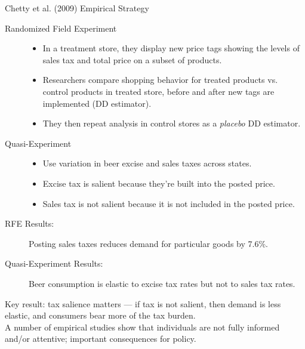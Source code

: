 \documentclass[8pt]{extarticle}
\begin{document}
  \begin{problem}{Chetty et al. (2009) Empirical Strategy}
    \begin{description}
      \item[Randomized Field Experiment]\hfill
        \begin{itemize}
          \item In a treatment store, they display new price tags showing the levels of sales tax and total price on a subset of products.
          \item Researchers compare shopping behavior for treated products vs. control products in treated store, before and after new tags are implemented (DD estimator).
          \item They then repeat analysis in control stores as a \textit{placebo} DD estimator.
        \end{itemize}
      \item[Quasi-Experiment]\hfill
        \begin{itemize}
          \item Use variation in beer excise and sales taxes across states.
          \item Excise tax is salient because they're built into the posted price.
          \item Sales tax is not salient because it is not included in the posted price.
        \end{itemize}
    \end{description}
    \begin{description}
      \item[RFE Results:] Posting sales taxes reduces demand for particular goods by 7.6\%.
      \item[Quasi-Experiment Results:] Beer consumption is elastic to excise tax rates but not to sales tax rates.
    \end{description}
    Key result: tax salience matters --- if tax is not salient, then demand is less elastic, and consumers bear more of the tax burden.\\

    A number of empirical studies show that individuals are not fully informed and/or attentive; important consequences for policy.
  \end{problem}
\end{document}
